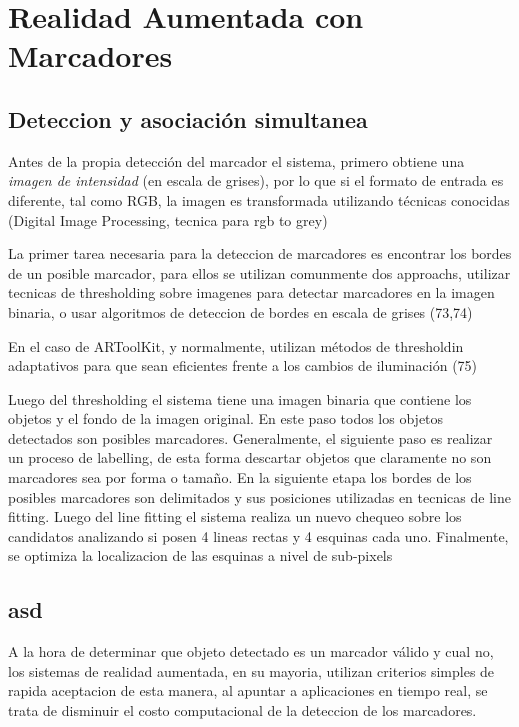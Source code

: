 \documentclass[runningheads]{llncs}
\begin{document}
\section{Realidad Aumentada con Marcadores}
\subsection{Deteccion y asociación simultanea}

Antes de la propia detección del marcador el sistema, primero obtiene una \textit{imagen de intensidad} (en escala de grises), por lo que si el formato de entrada es diferente, tal como RGB, la imagen es transformada utilizando técnicas conocidas
(Digital Image Processing, tecnica para rgb to grey)

La primer tarea necesaria para la deteccion de marcadores es encontrar los bordes de un posible marcador, para ellos se utilizan comunmente dos approachs, utilizar tecnicas de thresholding sobre imagenes para detectar marcadores en la imagen binaria, o usar algoritmos de deteccion de bordes en escala de grises (73,74)

En el caso de ARToolKit, y normalmente, utilizan métodos de thresholdin adaptativos para que sean eficientes frente a los cambios de iluminación (75)

Luego del thresholding el sistema tiene una imagen binaria que contiene los objetos y el fondo de la imagen original. En este paso todos los objetos detectados son posibles marcadores. Generalmente, el siguiente paso es realizar un proceso de labelling, de esta forma descartar objetos que claramente no son marcadores sea por forma o tamaño.
En la siguiente etapa los bordes de los posibles marcadores son delimitados y sus posiciones utilizadas en tecnicas de line fitting. Luego del line fitting el sistema realiza un nuevo chequeo sobre los candidatos analizando si posen 4 lineas rectas y 4 esquinas cada uno. Finalmente, se optimiza la localizacion de las esquinas a nivel de sub-pixels

\subsection{asd}
A la hora de determinar que objeto detectado es un marcador válido y cual no, los sistemas de realidad aumentada, en su mayoria, utilizan criterios simples de rapida aceptacion de esta manera, al apuntar a aplicaciones en tiempo real, se trata de disminuir el costo computacional de la deteccion de los marcadores.
\end{document}
